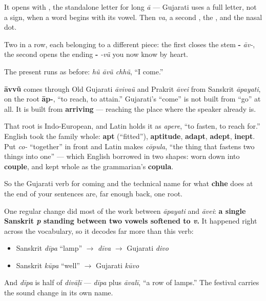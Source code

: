 It opens with \textbf{}, the standalone letter for long \emph{ā} — Gujarati uses a full letter, not a sign, when a word begins with its vowel. Then \textbf{} \emph{va}, a second \textbf{}, the \textbf{}, and the nasal dot.

Two \textbf{} in a row, each belonging to a different piece: the first closes the stem \textbf{-} \emph{āv-}, the second opens the ending \textbf{-} \emph{-vũ} you now know by heart.

The present runs as before: \emph{hũ āvũ chhũ}, \textquotedblleft{}I come.\textquotedblright{}

\begin{cousinweb}
\textbf{āvvũ} comes through Old Gujarati \emph{āvivaũ} and Prakrit \emph{āvei} from Sanskrit \emph{āpayati}, on the root \textbf{āp-}, \textquotedblleft{}to reach, to attain.\textquotedblright{} Gujarati's \textquotedblleft{}come\textquotedblright{} is not built from \textquotedblleft{}go\textquotedblright{} at all. It is built from \textbf{arriving} — reaching the place where the speaker already is.

That root is Indo-European, and Latin holds it as \emph{apere}, \textquotedblleft{}to fasten, to reach for.\textquotedblright{} English took the family whole: \textbf{apt} (\textquotedblleft{}fitted\textquotedblright{}), \textbf{aptitude}, \textbf{adapt}, \textbf{adept}, \textbf{inept}. Put \emph{co-} \textquotedblleft{}together\textquotedblright{} in front and Latin makes \emph{cōpula}, \textquotedblleft{}the thing that fastens two things into one\textquotedblright{} — which English borrowed in two shapes: worn down into \textbf{couple}, and kept whole as the grammarian's \textbf{copula}.

So the Gujarati verb for coming and the technical name for what \textbf{chhe} does at the end of your sentences are, far enough back, one root.
\end{cousinweb}

\begin{grammarlens}[title={What you've built: the \emph{p} that softened to a \emph{v}}]
One regular change did most of the work between \emph{āpayati} and \emph{āvei}: \textbf{a single Sanskrit \emph{p} standing between two vowels softened to \emph{v}.} It happened right across the vocabulary, so it decodes far more than this verb:

\begin{itemize}
\raggedright
  \item Sanskrit \emph{dīpa} \textquotedblleft{}lamp\textquotedblright{} $\to$ \emph{dīva} $\to$ Gujarati \emph{divo}
  \item Sanskrit \emph{kūpa} \textquotedblleft{}well\textquotedblright{} $\to$ Gujarati \emph{kūvo}
\end{itemize}

And \emph{dīpa} is half of \textbf{} \emph{divāḷī} — \emph{dīpa} plus \emph{āvalī}, \textquotedblleft{}a row of lamps.\textquotedblright{} The festival carries the sound change in its own name.
\end{grammarlens}


